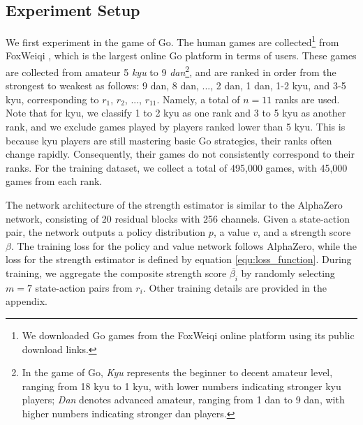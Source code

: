 \subsection{Experiment Setup}
\label{subsec:exp_setups}
We first experiment in the game of Go.
The human games are collected\footnote{We downloaded Go games from the FoxWeiqi online platform using its public download links.} from FoxWeiqi \citep{fox_weiqi_2024}, which is the largest online Go platform in terms of users.
These games are collected from amateur 5 \textit{kyu} to 9 \textit{dan}\footnote{In the game of Go, \textit{Kyu} represents the beginner to decent amateur level, ranging from 18 kyu to 1 kyu, with lower numbers indicating stronger kyu players; \textit{Dan} denotes advanced amateur, ranging from 1 dan to 9 dan, with higher numbers indicating stronger dan players.}, and are ranked in order from the strongest to weakest as follows: 9 dan, 8 dan, ..., 2 dan, 1 dan, 1-2 kyu, and 3-5 kyu, corresponding to $r_1$, $r_2$, ..., $r_{11}$.
Namely, a total of $n=11$ ranks are used.
Note that for kyu, we classify 1 to 2 kyu as one rank and 3 to 5 kyu as another rank, and we exclude games played by players ranked lower than 5 kyu.
This is because kyu players are still mastering basic Go strategies, their ranks often change rapidly.
Consequently, their games do not consistently correspond to their ranks.
For the training dataset, we collect a total of 495,000 games, with 45,000 games from each rank.

The network architecture of the strength estimator is similar to the AlphaZero network, consisting of 20 residual blocks with 256 channels.
Given a state-action pair, the network outputs a policy distribution $p$, a value $v$, and a strength score $\beta$.
The training loss for the policy and value network follows AlphaZero, while the loss for the strength estimator is defined by equation \ref{equ:loss_function}.
During training, we aggregate the composite strength score $\overline{\beta_i}$ by randomly selecting $m=7$ state-action pairs from $r_i$.
Other training details are provided in the appendix.

